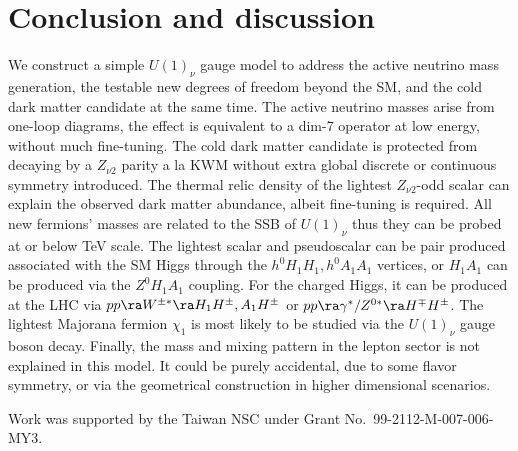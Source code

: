 \documentclass[aps,prd,preprint,nofootinbib]{revtex4}
\begin{document}
\section{Conclusion and discussion}
We construct a simple $U(1)_\nu$ gauge model to address the active
neutrino mass generation, the testable new degrees of freedom
beyond the SM, and the cold dark matter candidate at the same time.
The active neutrino masses arise from one-loop diagrams, the effect is equivalent to
a dim-7 operator at  low energy, without much fine-tuning. The cold dark matter candidate is protected from decaying
by a $Z_{\nu 2}$ parity a la KWM without extra global
discrete or continuous symmetry introduced. The thermal relic density of the
lightest $Z_{\nu 2}$-odd scalar can explain the observed dark
matter abundance, albeit  fine-tuning is required. All new
fermions' masses are related to the SSB of $U(1)_\nu$ thus they
can be probed at or below  TeV scale. The lightest scalar and
pseudoscalar  can be pair produced associated with the SM Higgs
through the $h^0 H_1 H_1, h^0 A_1 A_1$ vertices, or $H_1 A_1$ can
be produced via the $Z^0 H_1 A_1$ coupling. For the charged Higgs,
it can be produced at the LHC via $pp\ra W^{\pm*}\ra H_1 H^\pm,
A_1 H^\pm$ or $pp\ra \gamma^*/Z^{0*}\ra H^\mp H^\pm$. The lightest
Majorana fermion $\chi_1$ is most likely to be studied via the
$U(1)_\nu$  gauge boson decay. Finally, the mass and mixing
pattern in the lepton sector is not explained in this model. It
could be purely accidental, due to some flavor
symmetry\cite{Ishimori:2010au},
 or via the geometrical construction in higher dimensional scenarios\cite{WF_extdim}.


\begin{acknowledgments}
Work was supported  by the Taiwan NSC under Grant No.\
99-2112-M-007-006-MY3.
\end{acknowledgments}
\end{document}
